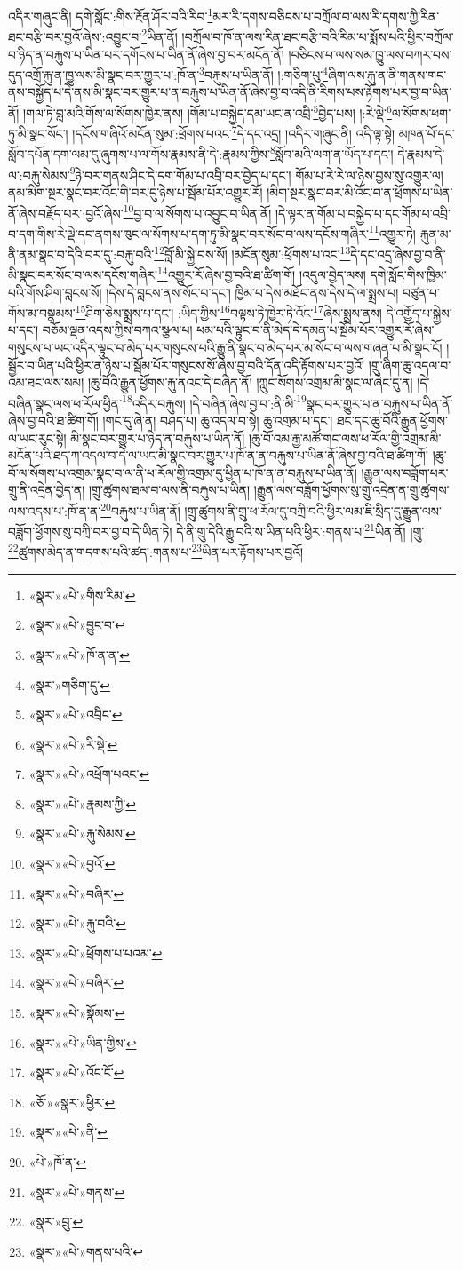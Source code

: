 འདིར་གཞུང་ནི། དགེ་སློང་:གིས་རྔོན་ཤོར་བའི་རིབ་\footnote{«སྣར་»«པེ་»གིས་རིམ་}མར་རི་དགས་བཅིངས་པ་བཀྲོལ་བ་ལས་རི་དགས་ཀྱི་རིན་ཐང་བརྩི་བར་བྱའོ་ཞེས་:འབྱུང་བ་\footnote{«སྣར་»«པེ་»བྱུང་བ་}ཡིན་ནོ། །བཀྲོལ་བ་ཁོ་ན་ལས་རིན་ཐང་བརྩི་བའི་རིམ་པ་སྨོས་པའི་ཕྱིར་བཀྲོལ་བ་ཉིད་ན་བརྐུས་པ་ཡིན་པར་དགོངས་པ་ཡིན་ནོ་ཞེས་བྱ་བར་མངོན་ནོ། །བཅིངས་པ་ལས་སམ་ཁྱུ་ལས་བཀར་བས་དུད་འགྲོ་རྐུ་ན་ཁྱུ་ལས་མི་སྣང་བར་གྱུར་པ་:ཁོ་ན་\footnote{«སྣར་»«པེ་»ཁོ་ན་ན་}བརྐུས་པ་ཡིན་ནོ། །:གཅིག་པུ་\footnote{«སྣར་»གཅིག་དུ་}ཞིག་ལས་རྐུ་ན་ནི་གནས་གང་ནས་བསྐྱོད་པ་དེ་ནས་མི་སྣང་བར་གྱུར་པ་ན་བརྐུས་པ་ཡིན་ནོ་ཞེས་བྱ་བ་འདི་ནི་རིགས་པས་རྟོགས་པར་བྱ་བ་ཡིན་ནོ། །གལ་ཏེ་བླ་མའི་གོས་ལ་སོགས་ཁྱེར་ནས། །གོམ་པ་བསྐྱེད་དམ་ཡང་ན་འབྲི་\footnote{«སྣར་»«པེ་»འབྲིང་}བྱེད་པས། །:རེ་ལྡེ་\footnote{«སྣར་»«པེ་»རི་སྡེ་}ལ་སོགས་ཕག་ཏུ་མི་སྣང་སོང་། །དངོས་གཞིའོ་མངོན་སུམ་:ཕྲོགས་པའང་\footnote{«སྣར་»«པེ་»འཕྲོག་པའང་}དེ་དང་འདྲ། །འདིར་གཞུང་ནི། འདི་ལྟ་སྟེ། མཁན་པོ་དང་སློབ་དཔོན་དག་ལམ་དུ་ཞུགས་པ་ལ་གོས་རྣམས་ནི་དེ་:རྣམས་ཀྱིས་\footnote{«སྣར་»«པེ་»རྣམས་ཀྱི་}སློབ་མའི་ལག་ན་ཡོད་པ་དང་། དེ་རྣམས་དེ་ལ་:བརྐུ་སེམས་\footnote{«སྣར་»«པེ་»རྐུ་སེམས་}ཉེ་བར་གནས་ཤིང་དེ་དག་གོམ་པ་འབྲི་བར་བྱེད་པ་དང་། གོམ་པ་རེ་རེ་ལ་ཉེས་བྱས་སུ་འགྱུར་ལ། ནམ་མིག་སྔར་སྣང་བར་འོང་གི་བར་དུ་ཉེས་པ་སྦོམ་པོར་འགྱུར་རོ། །མིག་སྔར་སྣང་བར་མི་འོང་བ་ན་ཕྲོགས་པ་ཡིན་ནོ་ཞེས་བརྗོད་པར་:བྱའོ་ཞེས་\footnote{«སྣར་»«པེ་»བྱའོ་}བྱ་བ་ལ་སོགས་པ་འབྱུང་བ་ཡིན་ནོ། །དེ་ལྟར་ན་གོམ་པ་བསྐྱེད་པ་དང་གོམ་པ་འབྲི་བ་དག་གིས་རེ་ལྡེ་དང་ནགས་ཁུང་ལ་སོགས་པ་དག་ཏུ་མི་སྣང་བར་སོང་བ་ལས་དངོས་གཞིར་\footnote{«སྣར་»«པེ་»བཞིར་}འགྱུར་ཏེ། རྐུན་མ་ནི་ནམ་སྣང་བ་དེའི་བར་དུ་:བརྐུ་བའི་\footnote{«སྣར་»«པེ་»རྐུ་བའི་}བློ་མི་སྐྱེ་བས་སོ། །མངོན་སུམ་:ཕྲོགས་པ་འང་\footnote{«སྣར་»«པེ་»ཕྲོགས་པ་པའམ་}དེ་དང་འདྲ་ཞེས་བྱ་བ་ནི་མི་སྣང་བར་སོང་བ་ལས་དངོས་གཞིར་\footnote{«སྣར་»«པེ་»བཞིར་}འགྱུར་རོ་ཞེས་བྱ་བའི་ཐ་ཚིག་གོ། །འདུལ་བྱེད་ལས། དགེ་སློང་གིས་ཁྱིམ་པའི་གོས་ཤིག་བླངས་སོ། །དེས་དེ་བླངས་ནས་སོང་བ་དང་། ཁྱིམ་པ་དེས་མཐོང་ནས་དེས་དེ་ལ་སྨྲས་པ། བཙུན་པ་གོས་མ་བསྣམས་\footnote{«སྣར་»«པེ་»སྣོམས་}ཤིག་ཅེས་སྨྲས་པ་དང་། :ཡིད་ཀྱིས་\footnote{«སྣར་»«པེ་»ཡིན་གྱིས་}བལྟས་ཏེ་ཁྱེར་ཏེ་འོང་\footnote{«སྣར་»«པེ་»འོང་ངོ་}ཞེས་སྨྲས་ནས། དེ་འགྱོད་པ་སྐྱེས་པ་དང་། བཅོམ་ལྡན་འདས་ཀྱིས་བཀའ་སྩལ་པ། ཕམ་པའི་ལྟུང་བ་ནི་མེད་དེ་དམན་པ་སྦོམ་པོར་འགྱུར་རོ་ཞེས་གསུངས་པ་ཡང་འདིར་ལྟུང་བ་མེད་པར་གསུངས་པའི་རྒྱུ་ནི་སྣང་བ་མེད་པར་མ་སོང་བ་ལས་གཞན་པ་མི་སྣང་ངོ། །སྦྱོར་བ་ཡིན་པའི་ཕྱིར་ན་ཉེས་པ་སྦོམ་པོར་གསུངས་སོ་ཞེས་བྱ་བའི་དོན་འདི་རྟོགས་པར་བྱའོ། །གྲུ་ཞིག་ཆུ་འདལ་བ་འམ་ཐང་ལས་སམ། །ཆུ་བོའི་རྒྱུན་ཕྱོགས་རྐུ་ནའང་དེ་བཞིན་ནོ། །ཀླུང་སོགས་འགྲམ་མི་སྣང་ལ་ཞེང་དུ་ན། །དེ་བཞིན་སྣང་ལས་ཕ་རོལ་ཕྱིན་\footnote{«ཅོ་»«སྣར་»ཕྱིར་}འདིར་བརྐུས། །དེ་བཞིན་ཞེས་བྱ་བ་:ནི་མི་\footnote{«སྣར་»«པེ་»ནི་}སྣང་བར་གྱུར་པ་ན་བརྐུས་པ་ཡིན་ནོ་ཞེས་བྱ་བའི་ཐ་ཚིག་གོ། །གང་དུ་ཞེ་ན། བཤད་པ། ཆུ་འདལ་བ་སྟེ། ཆུ་འགྲམ་པ་དང་། ཐང་དང་ཆུ་བོའི་རྒྱུན་ཕྱོགས་ལ་ཡང་རུང་སྟེ། མི་སྣང་བར་གྱུར་པ་ཉིད་ན་བརྐུས་པ་ཡིན་ནོ། །ཆུ་བོ་འམ་རྒྱ་མཚོ་གང་ལས་ཕ་རོལ་གྱི་འགྲམ་མི་མངོན་པའི་ཐད་ཀ་འདལ་བ་དེ་ལ་ཡང་མི་སྣང་བར་གྱུར་པ་ཁོ་ན་ན་བརྐུས་པ་ཡིན་ནོ་ཞེས་བྱ་བའི་ཐ་ཚིག་གོ། །ཆུ་བོ་ལ་སོགས་པ་འགྲམ་སྣང་བ་ལ་ནི་ཕ་རོལ་གྱི་འགྲམ་དུ་ཕྱིན་པ་ཁོ་ན་ན་བརྐུས་པ་ཡིན་ནོ། །རྒྱུན་ལས་བཟློག་པར་གྲུ་ནི་འདྲེན་བྱེད་ན། །གྲུ་ཚུགས་ཐལ་བ་ལས་ནི་བརྐུས་པ་ཡིན། །རྒྱུན་ལས་བཟློག་ཕྱོགས་སུ་གྲུ་འདྲེན་ན་གྲུ་ཚུགས་ལས་འདས་པ་:ཁོ་ན་ན་\footnote{«པེ་»ཁོ་ན་}བརྐུས་པ་ཡིན་ནོ། །གྲུ་ཚུགས་ནི་གྲུ་ཕ་རོལ་དུ་བཀྲི་བའི་ཕྱིར་ལམ་ཇི་སྲིད་དུ་རྒྱུན་ལས་བཟློག་ཕྱོགས་སུ་བཀྲི་བར་བྱ་བ་དེ་ཡིན་ཏེ། དེ་ནི་གྲུ་དེའི་རྒྱུ་བའི་ས་ཡིན་པའི་ཕྱིར་:གནས་པ་\footnote{«སྣར་»«པེ་»གནས་}ཡིན་ནོ། །གྲུ་\footnote{«སྣར་»བྲུ་}ཚུགས་མེད་ན་གདགས་པའི་ཚད་:གནས་པ་\footnote{«སྣར་»«པེ་»གནས་པའི་}ཡིན་པར་རྟོགས་པར་བྱའོ། 